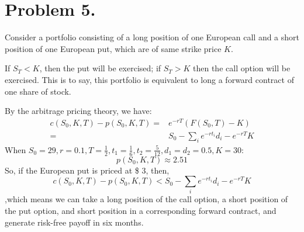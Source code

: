 \documentclass{article}
\begin{document}
\section{Problem 5.}
Consider a portfolio consisting of a long position of one European call and a short position of one European put, which are of same strike price $K$.

If $S_T<K$, then the put will be exercised; if $S_T>K$ then the call option will be exercised. This is to say, this portfolio is equivalent to long a forward contract of one share of stock.

By the arbitrage pricing theory, we have:
\begin{align}
  c(S_0, K, T) - p(S_0, K, T) =&e^{-rT}(F(S_0,T)- K)\\
  =&S_0 - \sum_{i}e^{-rt_i}d_i - e^{-rT}K
\end{align}
When $S_0 = 29, r=0.1, T=\frac{1}{2}, t_1 = \frac{1}{6}, t_2 = \frac{5}{12}, d_1 = d_2 = 0.5, K=30$:
\begin{equation}
  p(S_0,K,T) \approx 2.51
\end{equation}
So, if the European put is priced at \$ 3, then,
\begin{equation}
  c(S_0, K, T) - p(S_0, K, T) < S_0 - \sum_{i}e^{-rt_i}d_i - e^{-rT}K
\end{equation}
,which means we can take a long position of the call option, a short position of the put option, and short position in a corresponding forward contract, and generate risk-free payoff in six months. 
\end{document}
